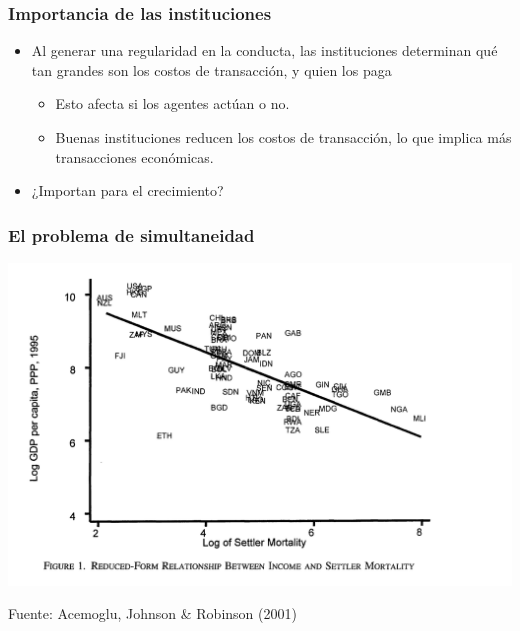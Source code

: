 \documentclass{beamer}
\begin{document}
\begin{frame}
\frametitle{Importancia de las instituciones}
\begin{itemize}
    \item Al generar una regularidad en la conducta, las instituciones determinan qué tan grandes son los costos de transacción, y quien los paga\vspace{2mm}
    \begin{itemize}
        \item Esto afecta si los agentes actúan o no.\vspace{2mm}
        \item Buenas instituciones reducen los costos de transacción, lo que implica más transacciones económicas.\vspace{4mm}
    \end{itemize}
    \item ¿Importan para el crecimiento?
\end{itemize}
\end{frame}

\begin{frame}
    \frametitle{El problema de simultaneidad}
    \small
    \centering
    \includegraphics[scale=0.35]{../Figures/Tema_04.1_examples2.png}

    Fuente: Acemoglu, Johnson \& Robinson (2001)
\end{frame}
\end{document}
